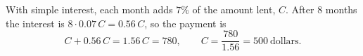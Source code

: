 With simple interest, each month adds $7\%$ of the amount lent, $C$. After $8$ months the interest is $8\cdot0.07\,C=0.56\,C$, so the payment is
\[C+0.56\,C=1.56\,C=780,\qquad C=\dfrac{780}{1.56}=\boxed{500}\ \text{dollars}.\]
